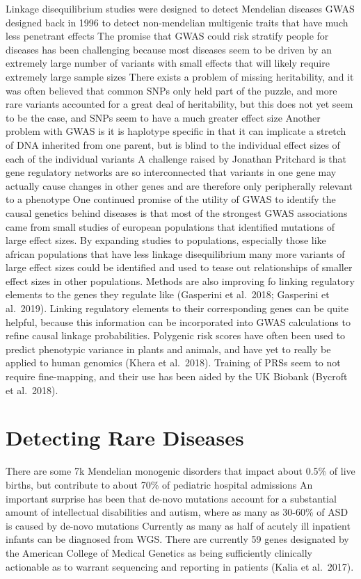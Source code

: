 \documentclass[]{book}
\begin{document}
Linkage disequilibrium studies were designed to detect Mendelian diseases
GWAS designed back in 1996 to detect non-mendelian multigenic traits that have much less penetrant effects
The promise that GWAS could risk stratify people for diseases has been challenging because most diseases seem to be driven by an extremely large number of variants with small effects that will likely require extremely large sample sizes
There exists a problem of missing heritability, and it was often believed that common SNPs only held part of the puzzle, and more rare variants accounted for a great deal of heritability, but this does not yet seem to be the case, and SNPs seem to have a much greater effect size
Another problem with GWAS is it is haplotype specific in that it can implicate a stretch of DNA inherited from one parent, but is blind to the individual effect sizes of each of the individual variants
A challenge raised by Jonathan Pritchard is that gene regulatory networks are so interconnected that variants in one gene may actually cause changes in other genes and are therefore only peripherally relevant to a phenotype
One continued promise of the utility of GWAS to identify the causal genetics behind diseases is that most of the strongest GWAS associations came from small studies of european populations that identified mutations of large effect sizes. By expanding studies to populations, especially those like african populations that have less linkage disequilibrium many more variants of large effect sizes could be identified and used to tease out relationships of smaller effect sizes in other populations.
Methods are also improving fo linking regulatory elements to the genes they regulate like (Gasperini et al.~2018; Gasperini et al.~2019).
Linking regulatory elements to their corresponding genes can be quite helpful, because this information can be incorporated into GWAS calculations to refine causal linkage probabilities.
Polygenic risk scores have often been used to predict phenotypic variance in plants and animals, and have yet to really be applied to human genomics (Khera et al.~2018).
Training of PRSs seem to not require fine-mapping, and their use has been aided by the UK Biobank (Bycroft et al.~2018).

\hypertarget{detecting-rare-diseases}{%
\section{Detecting Rare Diseases}\label{detecting-rare-diseases}}

There are some 7k Mendelian monogenic disorders that impact about 0.5\% of live births, but contribute to about 70\% of pediatric hospital admissions
An important surprise has been that de-novo mutations account for a substantial amount of intellectual disabilities and autism, where as many as 30-60\% of ASD is caused by de-novo mutations
Currently as many as half of acutely ill inpatient infants can be diagnosed from WGS.
There are currently 59 genes designated by the American College of Medical Genetics as being sufficiently clinically actionable as to warrant sequencing and reporting in patients (Kalia et al.~2017).
\end{document}
